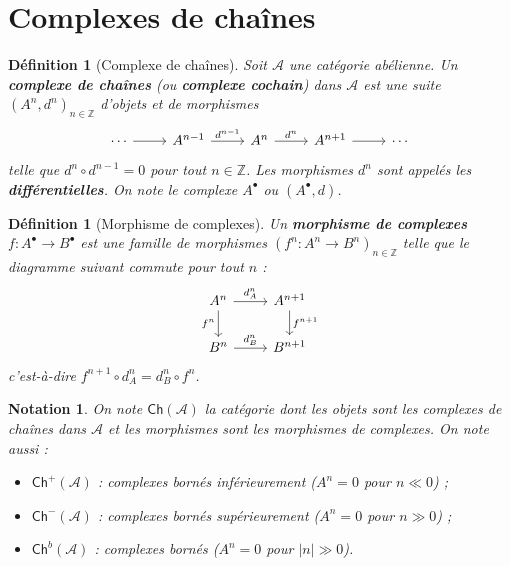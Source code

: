 \documentclass[a4paper,12pt]{book}
\newcommand{\Z}{\mathbb{Z}}
\newtheorem{definition}[theoreme]{Définition}
\newtheorem*{notation}{Notation}
\begin{document}

\section{Complexes de chaînes}\label{sec:chain-complexes}

\begin{definition}[Complexe de chaînes]\label{def:chain-complex}
Soit $\mathcal{A}$ une catégorie abélienne. Un \textbf{complexe de chaînes}
(ou \textbf{complexe cochain}) dans $\mathcal{A}$ est une suite
$(A^n, d^n)_{n \in \Z}$ d'objets et de morphismes
\[
\begin{tikzcd}
\cdots \arrow[r] & A^{n-1} \arrow[r, "d^{n-1}"] & A^n \arrow[r, "d^n"]
  & A^{n+1} \arrow[r] & \cdots
\end{tikzcd}
\]
telle que $d^{n} \circ d^{n-1} = 0$ pour tout $n \in \Z$.
Les morphismes $d^n$ sont appelés les \textbf{différentielles}.
On note le complexe $A^\bullet$ ou $(A^\bullet, d)$.
\end{definition}

\begin{definition}[Morphisme de complexes]\label{def:chain-map}
Un \textbf{morphisme de complexes} $f \colon A^\bullet \to B^\bullet$
est une famille de morphismes $(f^n \colon A^n \to B^n)_{n \in \Z}$
telle que le diagramme suivant commute pour tout $n$ :
\[
\begin{tikzcd}
A^n \arrow[r, "d_A^n"] \arrow[d, "f^n"'] & A^{n+1} \arrow[d, "f^{n+1}"] \\
B^n \arrow[r, "d_B^n"] & B^{n+1}
\end{tikzcd}
\]
c'est-à-dire $f^{n+1} \circ d_A^n = d_B^n \circ f^n$.
\end{definition}

\begin{notation}\label{not:Ch}
On note $\mathsf{Ch}(\mathcal{A})$ la catégorie dont les objets sont les
complexes de chaînes dans $\mathcal{A}$ et les morphismes sont les
morphismes de complexes. On note aussi :
\begin{itemize}
\item $\mathsf{Ch}^+(\mathcal{A})$ :
  complexes bornés inférieurement ($A^n = 0$ pour $n \ll 0$) ;
\item $\mathsf{Ch}^-(\mathcal{A})$ :
  complexes bornés supérieurement ($A^n = 0$ pour $n \gg 0$) ;
\item $\mathsf{Ch}^b(\mathcal{A})$ :
  complexes bornés ($A^n = 0$ pour $|n| \gg 0$).
\end{itemize}
\end{notation}
\end{document}
